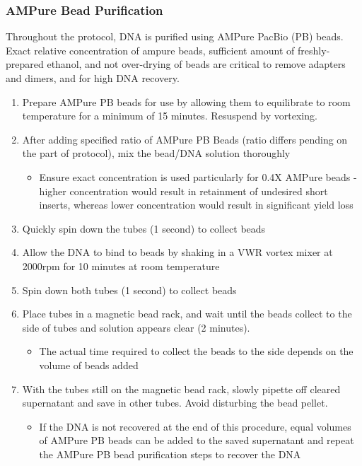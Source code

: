 \subsubsection{AMPure Bead Purification}
Throughout the protocol, DNA is purified using AMPure PacBio (PB) beads. Exact relative concentration of ampure beads, sufficient amount of freshly-prepared ethanol, and not over-drying of beads are critical to remove adapters and dimers, and for high DNA recovery.   
\label{general_ampure_bead_purification}
\begin{enumerate}
	\item Prepare AMPure PB beads for use by allowing them to equilibrate to room temperature for a minimum of 15 minutes. Resuspend by vortexing.
	\item After adding specified ratio of AMPure PB Beads (ratio differs pending on the part of protocol), mix the bead/DNA solution thoroughly 
	\begin{itemize}
		\item Ensure exact concentration is used particularly for 0.4X AMPure beads - higher concentration would result in retainment of undesired short inserts, whereas lower concentration would result in significant yield loss 
	\end{itemize} 
	\item Quickly spin down the tubes (1 second) to collect beads 
	\item Allow the DNA to bind to beads by shaking in a VWR vortex mixer at 2000rpm for 10 minutes at room temperature 
	\item Spin down both tubes (1 second) to collect beads 
	\item Place tubes in a magnetic bead rack, and wait until the beads collect to the side of tubes and solution appears clear (2 minutes).
	\begin{itemize}
		\item The actual time required to collect the beads to the side depends on the volume of beads added
	\end{itemize} 
	\item With the tubes still on the magnetic bead rack, slowly pipette off cleared supernatant and save in other tubes. Avoid disturbing the bead pellet.
		\begin{itemize}
		\item If the DNA is not recovered at the end of this procedure, equal volumes of AMPure PB beads can be added to the saved supernatant and repeat the AMPure PB bead purification steps to recover the DNA

\end{itemize}
\end{enumerate}
